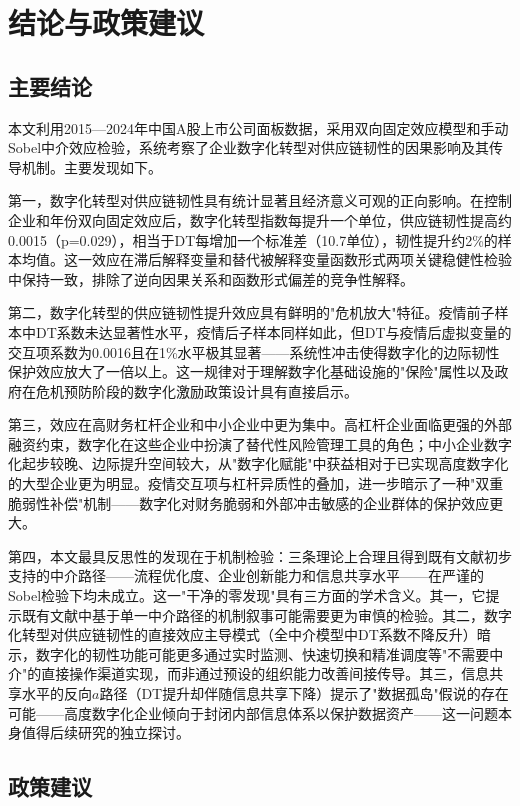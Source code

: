 \section{结论与政策建议}

\subsection{主要结论}

本文利用2015—2024年中国A股上市公司面板数据，采用双向固定效应模型和手动Sobel中介效应检验，系统考察了企业数字化转型对供应链韧性的因果影响及其传导机制。主要发现如下。

第一，数字化转型对供应链韧性具有统计显著且经济意义可观的正向影响。在控制企业和年份双向固定效应后，数字化转型指数每提升一个单位，供应链韧性提高约0.0015（p=0.029），相当于DT每增加一个标准差（10.7单位），韧性提升约2\%的样本均值。这一效应在滞后解释变量和替代被解释变量函数形式两项关键稳健性检验中保持一致，排除了逆向因果关系和函数形式偏差的竞争性解释。

第二，数字化转型的供应链韧性提升效应具有鲜明的"危机放大"特征。疫情前子样本中DT系数未达显著性水平，疫情后子样本同样如此，但DT与疫情后虚拟变量的交互项系数为0.0016且在1\%水平极其显著——系统性冲击使得数字化的边际韧性保护效应放大了一倍以上。这一规律对于理解数字化基础设施的"保险"属性以及政府在危机预防阶段的数字化激励政策设计具有直接启示。

第三，效应在高财务杠杆企业和中小企业中更为集中。高杠杆企业面临更强的外部融资约束，数字化在这些企业中扮演了替代性风险管理工具的角色；中小企业数字化起步较晚、边际提升空间较大，从"数字化赋能"中获益相对于已实现高度数字化的大型企业更为明显。疫情交互项与杠杆异质性的叠加，进一步暗示了一种"双重脆弱性补偿"机制——数字化对财务脆弱和外部冲击敏感的企业群体的保护效应更大。

第四，本文最具反思性的发现在于机制检验：三条理论上合理且得到既有文献初步支持的中介路径——流程优化度、企业创新能力和信息共享水平——在严谨的Sobel检验下均未成立。这一"干净的零发现"具有三方面的学术含义。其一，它提示既有文献中基于单一中介路径的机制叙事可能需要更为审慎的检验。其二，数字化转型对供应链韧性的直接效应主导模式（全中介模型中DT系数不降反升）暗示，数字化的韧性功能可能更多通过实时监测、快速切换和精准调度等"不需要中介"的直接操作渠道实现，而非通过预设的组织能力改善间接传导。其三，信息共享水平的反向$ a $路径（DT提升却伴随信息共享下降）提示了"数据孤岛"假说的存在可能——高度数字化企业倾向于封闭内部信息体系以保护数据资产——这一问题本身值得后续研究的独立探讨。

\subsection{政策建议}

